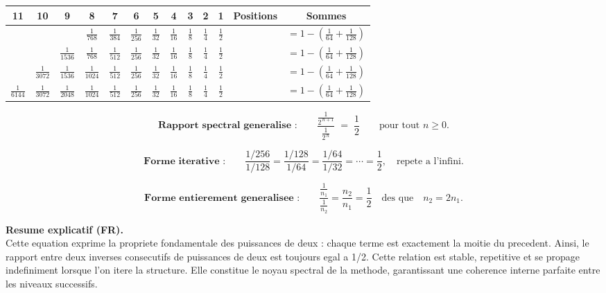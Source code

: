 \documentclass[a4paper,11pt]{article}
\begin{document}
\begin{center}
\scriptsize
\begin{tabular}{|c|c|c|c|c|c|c|c|c|c|c|c|c|}
\hline
11 & 10 & 9 & 8 & 7 & 6 & 5 & 4 & 3 & 2 & 1 & \textbf{Positions} & \textbf{Sommes} \\
\hline
 &  &  & $\frac{1}{768}$ & $\frac{1}{384}$ & $\frac{1}{256}$ & $\frac{1}{32}$ & $\frac{1}{16}$ & $\frac{1}{8}$ & $\frac{1}{4}$ & $\frac{1}{2}$ &  & $= 1 - \left(\frac{1}{64} + \frac{1}{128}\right)$ \\
\hline
 &  & $\frac{1}{1536}$ & $\frac{1}{768}$ & $\frac{1}{512}$ & $\frac{1}{256}$ & $\frac{1}{32}$ & $\frac{1}{16}$ & $\frac{1}{8}$ & $\frac{1}{4}$ & $\frac{1}{2}$ &  & $= 1 - \left(\frac{1}{64} + \frac{1}{128}\right)$ \\
\hline
 & $\frac{1}{3072}$ & $\frac{1}{1536}$ & $\frac{1}{1024}$ & $\frac{1}{512}$ & $\frac{1}{256}$ & $\frac{1}{32}$ & $\frac{1}{16}$ & $\frac{1}{8}$ & $\frac{1}{4}$ & $\frac{1}{2}$ &  & $= 1 - \left(\frac{1}{64} + \frac{1}{128}\right)$ \\
\hline
$\frac{1}{6144}$ & $\frac{1}{3072}$ & $\frac{1}{2048}$ & $\frac{1}{1024}$ & $\frac{1}{512}$ & $\frac{1}{256}$ & $\frac{1}{32}$ & $\frac{1}{16}$ & $\frac{1}{8}$ & $\frac{1}{4}$ & $\frac{1}{2}$ &  & $= 1 - \left(\frac{1}{64} + \frac{1}{128}\right)$ \\
\hline
\end{tabular}
\end{center}


\[
\textbf{Rapport spectral generalise :}\qquad
\frac{\displaystyle \frac{1}{2^{\,n+1}}}{\displaystyle \frac{1}{2^{\,n}}}
\;=\;
\frac{1}{2}
\qquad\text{pour tout } n \ge 0.
\]

\[
\textbf{Forme iterative :}\qquad
\frac{1/256}{1/128}
=
\frac{1/128}{1/64}
=
\frac{1/64}{1/32}
=
\cdots
=
\frac{1}{2},
\quad
\text{repete a l'infini.}
\]

\[
\textbf{Forme entierement generalisee :}\qquad
\frac{\displaystyle \frac{1}{n_1}}{\displaystyle \frac{1}{n_2}}
=
\frac{n_2}{n_1}
=
\frac{1}{2}
\quad\text{des que}\quad
n_2 = 2n_1.
\]

\textbf{Resume explicatif (FR).} \\
Cette equation exprime la propriete fondamentale des puissances de deux : chaque terme
est exactement la moitie du precedent. Ainsi, le rapport entre deux inverses consecutifs
de puissances de deux est toujours egal a 1/2. Cette relation est stable, repetitive
et se propage indefiniment lorsque l'on itere la structure. Elle constitue le noyau
spectral de la methode, garantissant une coherence interne parfaite entre les niveaux
successifs.
\end{document}
